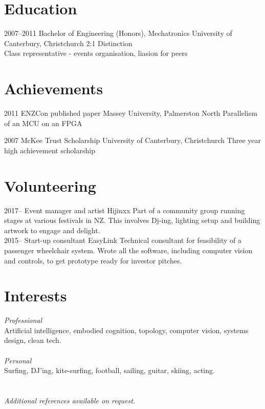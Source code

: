 \documentclass[print]{friggeri-cv} %
\begin{document}
\section{Education}
\begin{entrylist}
\entry
{2007--2011}
{Bachelor of Engineering (Honors), Mechatronics}
{University of Canterbury, Christchurch}
{2:1 Distinction\\
Class representative - events organisation, liasion for peers}
\end{entrylist}
\section{Achievements}
\begin{entrylist}
\entry
{2011}
{ENZCon published paper}
{Massey University, Palmerston North}
{Parallelism of an MCU on an FPGA}

\entry
{2007}
{McKee Trust Scholarship}
{University of Canterbury, Christchurch}
{Three year high achievement scholarship}
\end{entrylist}

\section{Volunteering}
\begin{entrylist}
\entry 
{2017-- }
{Event manager and artist}
{Hijinxx}
{Part of a community group running stages at various festivals in NZ. This involves Dj-ing, lighting setup and building artwork to engage and delight.} \\
\entry
{2015--}
{Start-up consultant}
{EasyLink}
{Technical consultant for feasibility of a passenger wheelchair system. Wrote all the software, including computer vision and controls, to get prototype ready for investor pitches.}
\end{entrylist}

\section{Interests}
\emph{Professional}\\ Artificial intelligence, embodied cognition, topology, computer vision, systems design, clean tech.\\
\\
\emph{Personal}\\ Surfing, DJ'ing, kite-surfing, football, sailing, guitar, skiing, acting.
\\ \\ \\ 
\emph{Additional references available on request.}
\end{document}
